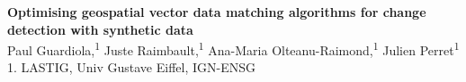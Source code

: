 \documentclass[11pt]{article}
\renewcommand{\title}[1]{{\noindent\large\bfseries#1\medskip\\}}
\renewcommand{\author}[2]{{\noindent #1 \medskip\\ \small #2 \medskip\\}}
\begin{document}





\title{Optimising geospatial vector data matching algorithms for change detection with synthetic data}
\author{
Paul Guardiola,\textsuperscript{1}
Juste Raimbault,\textsuperscript{1}
Ana-Maria Olteanu-Raimond,\textsuperscript{1}
Julien Perret\textsuperscript{1}
}
{
1. LASTIG, Univ Gustave Eiffel, IGN-ENSG
}

\end{document}
